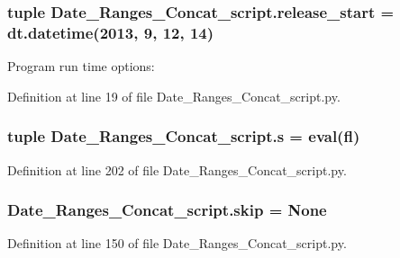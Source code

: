 \subsubsection[{release\+\_\+start}]{\setlength{\rightskip}{0pt plus 5cm}tuple Date\+\_\+\+Ranges\+\_\+\+Concat\+\_\+script.\+release\+\_\+start = dt.\+datetime(2013, 9, 12, 14)}\label{namespace_date___ranges___concat__script_a8d1f404553f799bb9ff6063b634827a3}


Program run time options\+: 



Definition at line 19 of file Date\+\_\+\+Ranges\+\_\+\+Concat\+\_\+script.\+py.

\hypertarget{namespace_date___ranges___concat__script_a068b2f68f66799aba475185bfe305eca}{}
\subsubsection[{s}]{\setlength{\rightskip}{0pt plus 5cm}tuple Date\+\_\+\+Ranges\+\_\+\+Concat\+\_\+script.\+s = eval(fl)}\label{namespace_date___ranges___concat__script_a068b2f68f66799aba475185bfe305eca}


Definition at line 202 of file Date\+\_\+\+Ranges\+\_\+\+Concat\+\_\+script.\+py.

\hypertarget{namespace_date___ranges___concat__script_a68d09e2180475d8aa358ed77f0e0c076}{}
\subsubsection[{skip}]{\setlength{\rightskip}{0pt plus 5cm}Date\+\_\+\+Ranges\+\_\+\+Concat\+\_\+script.\+skip = None}\label{namespace_date___ranges___concat__script_a68d09e2180475d8aa358ed77f0e0c076}


Definition at line 150 of file Date\+\_\+\+Ranges\+\_\+\+Concat\+\_\+script.\+py.

\hypertarget{namespace_date___ranges___concat__script_a81b3856c7074c340f9a8124ee1335487}{}
